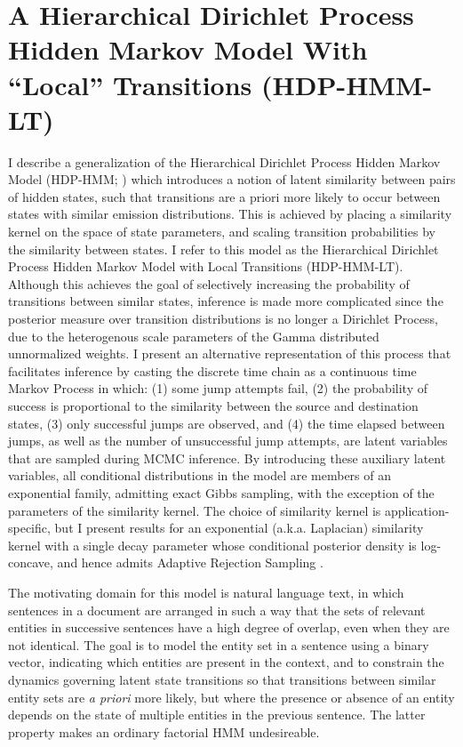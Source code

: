 \documentclass[12pt,letterpaper]{report}
\begin{document}
\chapter{A Hierarchical Dirichlet Process Hidden Markov Model With ``Local'' Transitions (HDP-HMM-LT)}
 I describe a generalization of the Hierarchical Dirichlet Process
Hidden Markov Model (HDP-HMM; \citet{teh2006hierarchical})
which introduces a notion of latent similarity between pairs of hidden
states, such that transitions are a priori more likely to occur between states
with similar emission distributions.  This is achieved by
placing a similarity kernel on the space of state parameters, and
scaling transition probabilities by the similarity between states.  
I refer to this model as the Hierarchical Dirichlet Process Hidden Markov Model with Local
Transitions (HDP-HMM-LT).  Although this achieves the goal of selectively increasing the
probability of transitions between similar states, inference is made
more complicated since the posterior measure over transition
distributions is no longer a Dirichlet Process, due to the
heterogenous scale parameters of the Gamma distributed unnormalized
weights.  I present an alternative representation of this process that facilitates
inference by casting the discrete time chain as a continuous time Markov Process
in which: (1) some jump attempts fail, (2) the probability of success is
proportional to the similarity between the source and destination
states, (3) only successful jumps are observed,
and (4) the time elapsed between jumps, as well as the number of
unsuccessful jump attempts, are latent variables that are sampled
during MCMC inference.  By introducing these auxiliary latent variables, all
conditional distributions in the model are members of an exponential
family, admitting exact Gibbs sampling,
with the exception of the parameters of the similarity kernel.
The choice of similarity kernel is application-specific, but I present
results for an exponential (a.k.a. Laplacian) similarity kernel with a single decay parameter
whose conditional posterior density is log-concave, and hence admits
Adaptive Rejection Sampling \citep{gilks1992adaptive}.

The motivating domain for this model is natural language text, in
which sentences in a document are arranged in such a way that
the sets of relevant entities in successive sentences have a high
degree of overlap, even when they are not identical.  The goal is to model the
entity set in a sentence using a binary vector, indicating which
entities are present in the context, and to constrain the dynamics 
governing latent state transitions so that
transitions between similar entity sets are {\it a priori} more
likely, but where the presence or absence of an entity depends on
the state of multiple entities in the previous sentence.  The latter
property makes an ordinary factorial HMM undesireable.  
\end{document}
